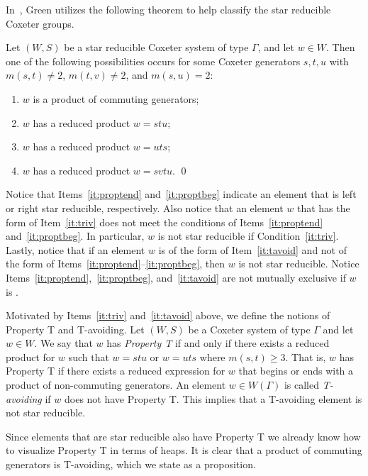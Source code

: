 In~\cite{Green2006a}, Green utilizes the following theorem to help classify the star reducible Coxeter groups. 
\begin{proposition}\label{thm:starred}
	Let $(W,S)$ be a star reducible Coxeter system of type $\Gamma$, and let $w \in W$. Then one of the following possibilities occurs for some Coxeter generators $s,t, u$ with $m(s,t) \neq 2$, $m(t,v) \neq 2$, and $m(s,u)=2$:
	\begin{enumerate}[leftmargin=2cm]
	\item $w$ is a product of commuting generators;\label{it:triv}
	\item $w$ has a reduced product $w=stu$;\label{it:proptend}
	\item $w$ has a reduced product $w=uts$;\label{it:proptbeg}
	\item $w$ has a reduced product $w=svtu$.\label{it:tavoid}	\qed
	\end{enumerate}
\end{proposition}

Notice that Items~\ref{it:proptend} and~\ref{it:proptbeg} indicate an element that is left or right star reducible, respectively. Also notice that an element $w$ that has the form of Item~\ref{it:triv} does not meet the conditions of Items~\ref{it:proptend} and~\ref{it:proptbeg}. In particular, $w$ is not star reducible if Condition~\ref{it:triv}. Lastly, notice that if an element $w$ is of the form of Item~\ref{it:tavoid} and not of the form of Items~\ref{it:proptend}--\ref{it:proptbeg}, then $w$ is not star reducible. Notice Items~\ref{it:proptend},~\ref{it:proptbeg}, and~\ref{it:tavoid} are not mutually exclusive if $w$ is .

Motivated by Items~\ref{it:triv} and~\ref{it:tavoid} above, we define the notions of Property T and T-avoiding. Let $(W,S)$ be a Coxeter system of type $\Gamma$ and let $w \in W$. We say that $w$ has \emph{Property T} if and only if there exists a reduced product for $w$ such that $w=stu$ or $w=uts$ where $m(s,t)\geq 3$. That is, $w$ has Property T if there exists a reduced expression for $w$ that begins or ends with a product of non-commuting generators. An element $w \in W(\Gamma)$ is called \emph{T-avoiding} if $w$ does not have Property T. This implies that a T-avoiding element is not star reducible.

 Since elements that are star reducible also have Property T we already know how to visualize Property T in terms of heaps. It is clear that a product of commuting generators is T-avoiding, which we state as a proposition.


